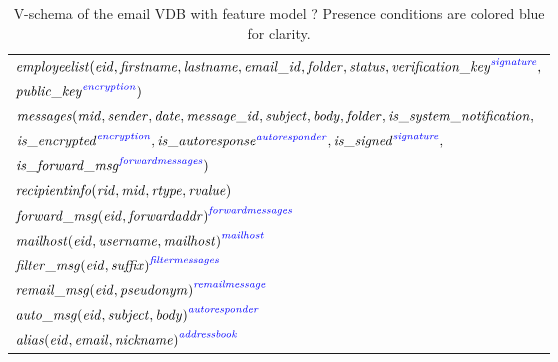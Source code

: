 \begin{table}
\caption{V-schema of the email VDB with feature model ?
Presence conditions are colored blue for clarity.
}
\label{tab:enron-vsch}
\centering
\small
\begin{tabular}{| l |}
\hline
$\employees(\eid,\fname,\lname,\emailid,\folder,\status,
 \annot[\fsignature]{\verificationkey},$\\
\hspace{60pt} $  \annot[\fencryption]{\publickey})$ \\
$\messages(\midatt, \sender, \dateatt, \messageid, \subject, \body, \folder,
  \issystemnotification,$\\
\hspace{44pt}  $  \annot[\fencryption]{\isencrypted},
\annot[\fautoresponder]{\isautoresponse},\annot[\fsignature]{\issigned},$\\
\hspace{44pt} $  \annot[\fforwardmsg]{\isforwardmsg})$\\
$\recipientinfo(\rid, \midatt, \rtype, \rvalue)$ \\
${\forwardmsg(\eid, \forwardaddr)}^{\fforwardmsg}$ \\
${\mailhost(\eid, \username, \mailhost)}^{\fmailhost}$\\
${\filtermsg(\eid, \suffix)}^{\ffiltermsg}$\\
${\remailmsg(\eid, \pseudonym)}^{\fremailmsg}$\\
${\automsg(\eid, \subject, \body)}^{\fautoresponder}$\\
${\alias(\eid, \emailAtt, \nickname)}^{\faddressbook}$\\
\hline
\end{tabular}
\end{table}

